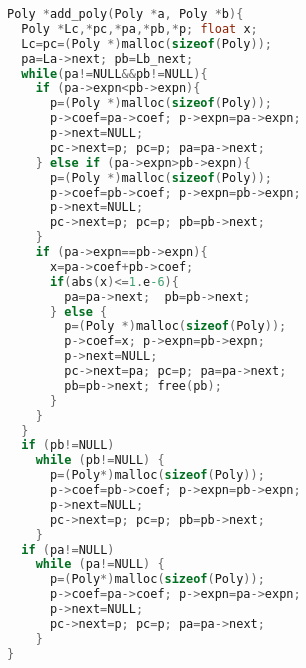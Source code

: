 \begin{frame}
\begin{lstlisting}[language=C,frame=none,extendedchars=false]
Poly *add_poly(Poly *a, Poly *b){
  Poly *Lc,*pc,*pa,*pb,*p; float x;
  Lc=pc=(Poly *)malloc(sizeof(Poly)); 
  pa=La->next; pb=Lb_next;
  while(pa!=NULL&&pb!=NULL){
    if (pa->expn<pb->expn){
      p=(Poly *)malloc(sizeof(Poly)); 
      p->coef=pa->coef; p->expn=pa->expn;
      p->next=NULL;
      pc->next=p; pc=p; pa=pa->next;
    } else if (pa->expn>pb->expn){
      p=(Poly *)malloc(sizeof(Poly)); 
      p->coef=pb->coef; p->expn=pb->expn;
      p->next=NULL;
      pc->next=p; pc=p; pb=pb->next;
    } 
    if (pa->expn==pb->expn){
      x=pa->coef+pb->coef;
      if(abs(x)<=1.e-6){
        pa=pa->next;  pb=pb->next;  
      } else {
        p=(Poly *)malloc(sizeof(Poly));
        p->coef=x; p->expn=pb->expn;
        p->next=NULL;
        pc->next=pa; pc=p; pa=pa->next;
        pb=pb->next; free(pb);
      }
    }
  }
  if (pb!=NULL)  
    while (pb!=NULL) {
      p=(Poly*)malloc(sizeof(Poly));
      p->coef=pb->coef; p->expn=pb->expn;
      p->next=NULL;
      pc->next=p; pc=p; pb=pb->next;
    }
  if (pa!=NULL)  
    while (pa!=NULL) {
      p=(Poly*)malloc(sizeof(Poly));
      p->coef=pa->coef; p->expn=pa->expn;
      p->next=NULL;
      pc->next=p; pc=p; pa=pa->next;
    }
}
\end{lstlisting}
\end{frame}	